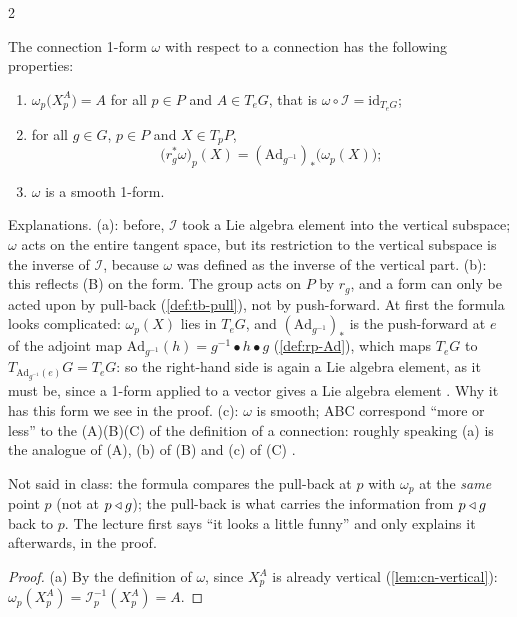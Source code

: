 \begin{paracol}{2}
\begin{theorem}\label{thm:cn-omega}
The connection 1-form $\omega$ with respect to a connection has the following properties:
\begin{enumerate}
  \item[(a)] $\omega_p\bigl(X^A_p\bigr)=A$ for all $p\in P$ and $A\in T_eG$, that is $\omega\circ\mathcal I=\mathrm{id}_{T_eG}$;
  \item[(b)] for all $g\in G$, $p\in P$ and $X\in T_pP$,
  \[
    \bigl(r_g^{*}\omega\bigr)_p(X)=(\mathrm{Ad}_{g^{-1}})_*\bigl(\omega_p(X)\bigr);
  \]
  \item[(c)] $\omega$ is a smooth 1-form.
\end{enumerate}
               
\end{theorem}
Explanations. (a): before, $\mathcal I$ took a Lie algebra element into the vertical subspace; $\omega$ acts on the entire tangent space, but its restriction to the vertical subspace is the inverse of $\mathcal I$, because $\omega$ was defined as the inverse of the vertical part. (b): this reflects (B) on the form. The group acts on $P$ by $r_g$, and a form can only be acted upon by pull-back (\cref{def:tb-pull}), not by push-forward. At first the formula looks complicated: $\omega_p(X)$ lies in $T_eG$, and $(\mathrm{Ad}_{g^{-1}})_*$ is the push-forward at $e$ of the adjoint map $\mathrm{Ad}_{g^{-1}}(h)=g^{-1}\bullet h\bullet g$ (\cref{def:rp-Ad}), which maps $T_eG$ to $T_{\mathrm{Ad}_{g^{-1}}(e)}G=T_eG$: so the right-hand side is again a Lie algebra element, as it must be, since a 1-form applied to a vector gives a Lie algebra element      . Why it has this form we see in the proof. (c): $\omega$ is smooth; ABC correspond ``more or less'' to the (A)(B)(C) of the definition of a connection: roughly speaking (a) is the analogue of (A), (b) of (B) and (c) of (C)  .
\begin{coursenote}
Not said in class: the formula compares the pull-back at $p$ with $\omega_p$ at the \emph{same} point $p$ (not at $p\mathbin{\triangleleft} g$); the pull-back is what carries the information from $p\mathbin{\triangleleft} g$ back to $p$. The lecture first says ``it looks a little funny'' and only explains it afterwards, in the proof. 
\end{coursenote}
\begin{proof}
(a) By the definition of $\omega$, since $X^A_p$ is already vertical (\cref{lem:cn-vertical}): $\omega_p(X^A_p)=\mathcal I_p^{-1}(X^A_p)=A$.    


\end{proof}
\end{paracol}
